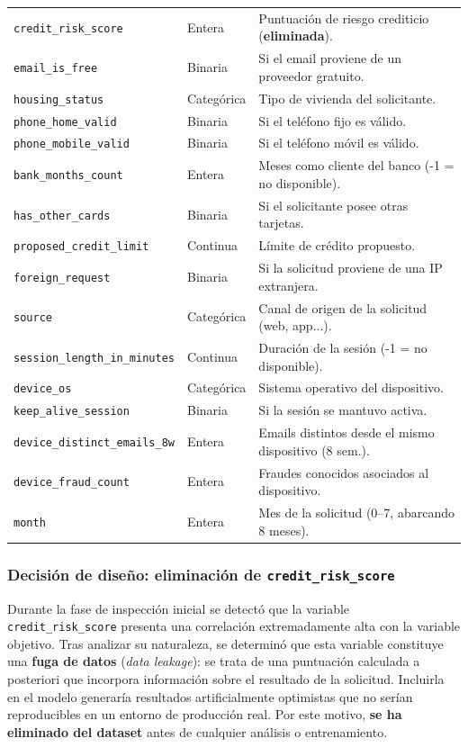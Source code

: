 \documentclass[12pt,a4paper]{report}
\begin{document}
\begin{table}[htbp]
\begin{tabular}{l l p{7.5cm}}
\texttt{credit\_risk\_score}    & Entera      & Puntuación de riesgo crediticio (\textbf{eliminada}). \\
\texttt{email\_is\_free}        & Binaria     & Si el email proviene de un proveedor gratuito. \\
\texttt{housing\_status}        & Categórica  & Tipo de vivienda del solicitante. \\
\texttt{phone\_home\_valid}     & Binaria     & Si el teléfono fijo es válido. \\
\texttt{phone\_mobile\_valid}   & Binaria     & Si el teléfono móvil es válido. \\
\texttt{bank\_months\_count}    & Entera      & Meses como cliente del banco (-1 = no disponible). \\
\texttt{has\_other\_cards}      & Binaria     & Si el solicitante posee otras tarjetas. \\
\texttt{proposed\_credit\_limit} & Continua   & Límite de crédito propuesto. \\
\texttt{foreign\_request}       & Binaria     & Si la solicitud proviene de una IP extranjera. \\
\texttt{source}                 & Categórica  & Canal de origen de la solicitud (web, app...). \\
\texttt{session\_length\_in\_minutes} & Continua & Duración de la sesión (-1 = no disponible). \\
\texttt{device\_os}             & Categórica  & Sistema operativo del dispositivo. \\
\texttt{keep\_alive\_session}   & Binaria     & Si la sesión se mantuvo activa. \\
\texttt{device\_distinct\_emails\_8w} & Entera & Emails distintos desde el mismo dispositivo (8 sem.). \\
\texttt{device\_fraud\_count}   & Entera      & Fraudes conocidos asociados al dispositivo. \\
\texttt{month}                  & Entera      & Mes de la solicitud (0--7, abarcando 8 meses). \\
\bottomrule
\end{tabular}
\end{table}

\subsubsection*{Decisión de diseño: eliminación de \texttt{credit\_risk\_score}}

Durante la fase de inspección inicial se detectó que la variable \texttt{credit\_risk\_score} presenta una correlación extremadamente alta con la variable objetivo. Tras analizar su naturaleza, se determinó que esta variable constituye una \textbf{fuga de datos} (\textit{data leakage}): se trata de una puntuación calculada a posteriori que incorpora información sobre el resultado de la solicitud. Incluirla en el modelo generaría resultados artificialmente optimistas que no serían reproducibles en un entorno de producción real. Por este motivo, \textbf{se ha eliminado del dataset} antes de cualquier análisis o entrenamiento.
\end{document}
